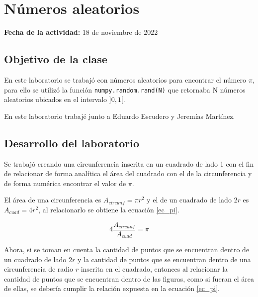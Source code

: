 \documentclass[../portafolio.tex]{subfiles}
\begin{document}
\section{Números aleatorios} 

\hfill \textbf{Fecha de la actividad:} 18 de noviembre de 2022

\medskip



\subsection{Objetivo de la clase}

En este laboratorio se trabajó con números aleatorios para encontrar el número $\pi$, para ello se utilizó la función \texttt{numpy.random.rand(N)} que retornaba N números aleatorios ubicados en el intervalo $]0,1[$.

\vspace{2mm}
En este laboratorio trabajé junto a Eduardo Escudero y Jeremías Martínez.




\subsection{Desarrollo del laboratorio}

Se trabajó creando una circunferencia inscrita en un cuadrado de lado 1 con el fin de relacionar de forma analítica el área del cuadrado con el de la circunferencia y de forma numérica encontrar el valor de $\pi$. 

\vspace{2mm}
El área de una circunferencia es $A_{circunf}= \pi r^2$ y el de un cuadrado de lado $2r$ es $A_{cuad}=4r^2$, al relacionarlo se obtiene la ecuación \ref{ec_pi}.

\begin{equation}
    4 \frac{A_{circunf}}{A_{cuad}} = \pi  \label{ec_pi}
\end{equation}

Ahora, si se toman en cuenta la cantidad de puntos que se encuentran dentro de un cuadrado de lado $2r$ y la cantidad de puntos que se encuentran dentro de una circunferencia de radio $r$ inscrita en el cuadrado, entonces al relacionar la cantidad de puntos que se encuentran dentro de las figuras, como si fueran el área de ellas, se debería cumplir la relación expuesta en la ecuación \ref{ec_pi}.
\end{document}

